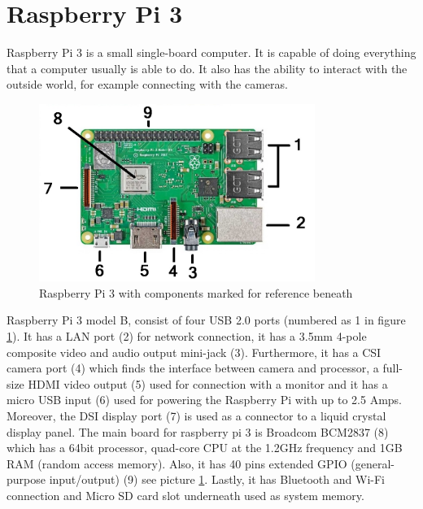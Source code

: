 

\section{Raspberry Pi 3}
Raspberry Pi 3 is a small single-board computer. It is capable of doing everything that a computer usually is able to do. It also has the ability to interact with the outside world, for example connecting with the cameras.\\

\begin{figure}[H]
\centering
\includegraphics[width=0.8\textwidth]{Figures/ConAnalysis/General/RASBERRY.jpg}
\caption{Raspberry Pi 3 with components marked for reference beneath}
\label{fig:rasber}
\end{figure}

Raspberry Pi 3 model B, consist of four USB 2.0 ports (numbered as 1 in figure \ref{fig:rasber}). It has a LAN port (2) for network connection, it has a 3.5mm 4-pole composite video and audio output mini-jack (3). Furthermore, it has a CSI camera port (4) which finds the interface between camera and processor, a full-size HDMI video output (5) used for connection with a monitor and it has a micro USB input (6) used for powering the Raspberry Pi with up to 2.5 Amps. Moreover, the DSI display port (7) is used as a connector to a liquid crystal display panel. The main board for raspberry pi 3 is Broadcom BCM2837 (8) which has a 64bit processor, quad-core CPU at the 1.2GHz frequency and 1GB RAM (random access memory). Also, it has 40 pins extended GPIO (general-purpose input/output) (9) see picture \ref{fig:rasber}. Lastly, it has Bluetooth and Wi-Fi connection and Micro SD card slot underneath used as system memory.  \\

